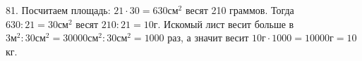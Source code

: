 81. Посчитаем площадь: $21\cdot30=630\text{см}^2$ весят 210 граммов. Тогда $630:21=30\text{см}^2$ весят $210:21=10$г. Искомый лист весит больше в $3\text{м}^2:30\text{см}^2=30000\text{см}^2:30\text{см}^2=1000$ раз, а значит весит $10\text{г}\cdot1000=10000\text{г}=10$кг.\\
